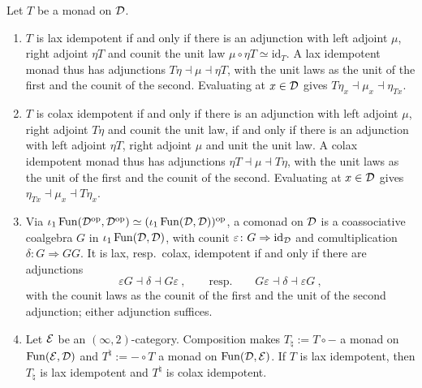 \begin{lem}
\label{lem:kz-basic}
%
Let $T$ be a monad on $\mathcal{D}$.
\begin{enumerate}
\item $T$ is lax idempotent if and only if there is an adjunction with left
adjoint $\mu$, right adjoint $\eta T$ and counit the unit law
$\mu \circ \eta T \simeq \mathrm{id}_{T}$.
A lax idempotent monad thus has adjunctions
$T\eta \dashv \mu \dashv \eta T$,
with the unit laws as the unit of the first and the counit of the second.
Evaluating at $x \in \mathcal{D}$ gives
$T\eta_{x} \dashv \mu_{x} \dashv \eta_{Tx}$.
\item $T$ is colax idempotent if and only if there is an adjunction with left
adjoint $\mu$, right adjoint $T\eta$ and counit the unit law, if and only if
there is an adjunction with left adjoint $\eta T$, right adjoint $\mu$ and unit
the unit law.
A colax idempotent monad thus has adjunctions
$\eta T \dashv \mu \dashv T\eta$,
with the unit laws as the unit of the first and the counit of the second.
Evaluating at $x \in \mathcal{D}$ gives
$\eta_{Tx} \dashv \mu_{x} \dashv T\eta_{x}$.
\item Via
$\iota_{1}\operatorname{Fun}(\mathcal{D}^{\mathrm{op}},\mathcal{D}^{\mathrm{op}}) \simeq (\iota_{1}\operatorname{Fun}(\mathcal{D},\mathcal{D}))^{\mathrm{op}}$,
a comonad on $\mathcal{D}$ is a coassociative coalgebra $G$ in
$\iota_{1}\operatorname{Fun}(\mathcal{D},\mathcal{D})$,
with counit
$\varepsilon\colon G \Rightarrow \mathrm{id}_{\mathcal{D}}$
and comultiplication
$\delta\colon G \Rightarrow GG$.
It is lax, resp.\ colax, idempotent if and only if there are adjunctions
\begin{equation*}
\varepsilon G \dashv \delta \dashv G\varepsilon \ , \qquad \text{resp.} \qquad
G\varepsilon \dashv \delta \dashv \varepsilon G \ ,
\end{equation*}
with the counit laws as the counit of the first and the unit of the second
adjunction; either adjunction suffices.
\item Let $\mathcal{E}$ be an $(\infty,2)$-category. Composition makes
$T_{\natural} := T \circ -$
a monad on $\operatorname{Fun}(\mathcal{E},\mathcal{D})$ and
$T^{\natural} := - \circ T$
a monad on $\operatorname{Fun}(\mathcal{D},\mathcal{E})$. If $T$ is lax idempotent, then $T_{\natural}$ is lax
idempotent and $T^{\natural}$ is colax idempotent.
\end{enumerate}
\end{lem}

